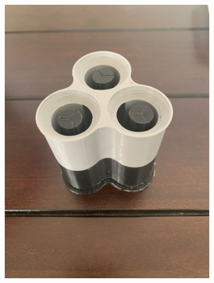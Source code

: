 \documentclass[twoside, 11pt]{article}
\begin{document}
\begin{figure}[H]
	\centering
	\begin{subfigure}[t]{0.165\linewidth}
		\centering
		\includegraphics[width=\textwidth]{prep mold}
	\end{subfigure}%
	\begin{subfigure}[t]{0.165\linewidth}
		\centering		

\end{subfigure}
\end{figure}
\end{document}
